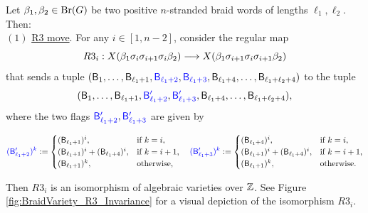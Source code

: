 \begin{lemma}\label{lem:braid_invariance}
Let $\beta_1,\beta_2\in\text{Br}(G)$ be two positive $n$-stranded braid words of lengths $\ell_1,\ell_2$. Then:\\

\noindent $(1)$ \underline{R3 move}. For any $i\in[1,n-2]$, consider the regular map
    $$R3_i:X(\beta_1\sigma_i\sigma_{i+1}\sigma_i\beta_2)\longrightarrow X(\beta_1\sigma_{i+1}\sigma_i\sigma_{i+1}\beta_2)$$
    \noindent that sends a tuple $(\mathsf{B}_1,\ldots,\mathsf{B}_{\ell_1+1},\color{blue}\mathsf{B}_{\ell_1+2}\color{black},\color{blue}\mathsf{B}_{\ell_1+3}\color{black},\mathsf{B}_{\ell_1+4},\ldots,\mathsf{B}_{\ell_1+\ell_2+4})$ to the tuple
    $$(\mathsf{B}_1,\ldots,\mathsf{B}_{\ell_1+1},\color{blue}\mathsf{B}'_{\ell_1+2}\color{black},\color{blue}\mathsf{B}'_{\ell_1+3}\color{black},\mathsf{B}_{\ell_1+4},\ldots,\mathsf{B}_{\ell_1+\ell_2+4}),$$
    \noindent where the two flags $\color{blue}\mathsf{B}'_{\ell_1+2}\color{black},\color{blue}\mathsf{B}'_{\ell_1+3}\color{black}$ are given by

    $$\color{blue}(\mathsf{B}'_{\ell_1+2})^k\color{black}:=\begin{cases}
			(\mathsf{B}_{\ell_1+1})^i, & \text{if $k=i$,}\\
            (\mathsf{B}_{\ell_1+1})^i+(\mathsf{B}_{\ell_1+4})^i, & \text{if $k=i+1$,}\\
            (\mathsf{B}_{\ell_1+1})^k, & \text{otherwise,}		 \end{cases}
          \quad \color{blue}(\mathsf{B}'_{\ell_1+3})^k\color{black}:=\begin{cases}
			(\mathsf{B}_{\ell_1+4})^i, & \text{if $k=i$,}\\
            (\mathsf{B}_{\ell_1+1})^i+(\mathsf{B}_{\ell_1+4})^i, & \text{if $k=i+1$,}\\
            (\mathsf{B}_{\ell_1+1})^k, & \text{otherwise.}		 \end{cases}$$
    
    \noindent Then $R3_i$ is an isomorphism of algebraic varieties over $\mathbb{Z}$. See Figure \ref{fig:BraidVariety_R3_Invariance} for a visual depiction of the isomorphism $R3_i$.\\


\end{lemma}
